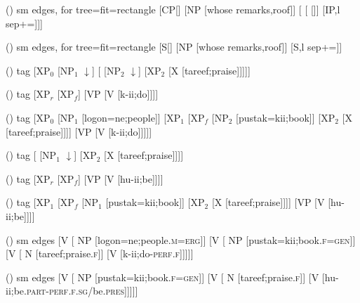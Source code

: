 \begin {forest}()
 sm edges, for tree={fit=rectangle} [CP{[]} [NP [whose remarks,roof]] [ [ [\trace ]] [IP,l sep+=]]] \end {forest}
\begin {forest}()
 sm edges, for tree={fit=rectangle} [S{[]} [NP [whose remarks,roof]] [S,l sep+=]] \end {forest}
\begin {forest}()
 tag [XP$_0$ [NP$_1$ $\downarrow $] [ [NP$_2$ $\downarrow $] [XP$_2$ [X [tareef;praise]]]]] \end {forest}
\begin {forest}()
 tag [XP$_r$ [XP$_f$] [VP [V [k-ii;do]]]] \end {forest}
\begin {forest}()
 tag [XP$_0$ [NP$_1$ [logon{=}ne;people]] [XP$_1$ [XP$_f$ [NP$_2$ [pustak{=}kii;book]] [XP$_2$ [X [tareef;praise]]]] [VP [V [k-ii;do]]]]] \end {forest}
\begin {forest}()
 tag [ [NP$_1$ $\downarrow $] [XP$_2$ [X [tareef;praise]]]] \end {forest}
\begin {forest}()
 tag [XP$_r$ [XP$_f$] [VP [V [hu-ii;be]]]] \end {forest}
\begin {forest}()
 tag [XP$_1$ [XP$_f$ [NP$_1$ [pustak{=}kii;book]] [XP$_2$ [X [tareef;praise]]]] [VP [V [hu-ii;be]]]] \end {forest}
\begin {forest}()
 sm edges [V [ NP [{logon=ne};{people.\textsc {m}{=}\textsc {erg}}]] [V [ NP [{pustak=kii};{book.\textsc {f}{=}\textsc {gen}}]] [V [ N [tareef;{praise.\textsc {f}}]] [V [k-ii;{do-\textsc {perf}.\textsc {f}}]]]]] \end {forest}
\begin {forest}()
 sm edges [V [ NP [{pustak=kii};{book.\textsc {f}{=}\textsc {gen}}]] [V [ N [tareef;{praise.\textsc {f}}]] [V [hu-ii;{be.\textsc {part}-\textsc {perf}.\textsc {f}.\textsc {sg}/be.\textsc {pres}}]]]]] \end {forest}
